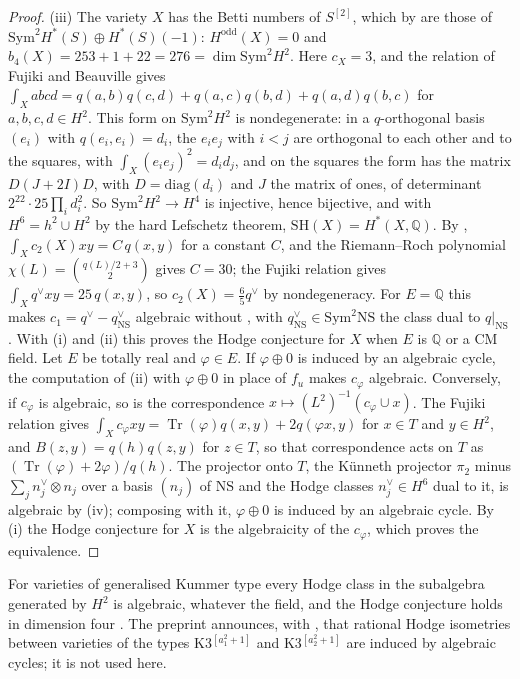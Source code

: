 \documentclass[11pt,reqno]{amsart}
\theoremstyle{plain}
\theoremstyle{definition}
\theoremstyle{remark}
\newcommand{\QQ}{\mathbb{Q}}
\newcommand{\NS}{\mathrm{NS}}
\DeclareMathOperator{\Tr}{Tr}
\begin{document}
\begin{proof}
(iii) The variety $X$ has the Betti numbers of $S^{[2]}$, which by
\cite{dCM02} are those of $\mathrm{Sym}^{2}H^{*}(S)\oplus H^{*}(S)(-1)$:
$H^{\mathrm{odd}}(X)=0$ and $b_{4}(X)=253+1+22=276=\dim\mathrm{Sym}^{2}H^{2}$.
Here $c_{X}=3$, and the relation of Fujiki and Beauville gives
$\int_{X}abcd=q(a,b)q(c,d)+q(a,c)q(b,d)+q(a,d)q(b,c)$ for $a,b,c,d\in H^{2}$.
This form on $\mathrm{Sym}^{2}H^{2}$ is nondegenerate: in a $q$-orthogonal
basis $(e_{i})$ with $q(e_{i},e_{i})=d_{i}$, the $e_{i}e_{j}$ with $i<j$ are
orthogonal to each other and to the squares, with $\int_{X}(e_{i}e_{j})^{2}=
d_{i}d_{j}$, and on the squares the form has the matrix $D(J+2I)D$, with
$D=\mathrm{diag}(d_{i})$ and $J$ the matrix of ones, of determinant
$2^{22}\cdot25\prod_{i}d_{i}^{2}$. So
$\mathrm{Sym}^{2}H^{2}\to H^{4}$ is injective, hence bijective, and with
$H^{6}=h^{2}\cup H^{2}$ by the hard Lefschetz theorem,
$\mathrm{SH}(X)=H^{*}(X,\QQ)$. By \cite{Fuj87},
$\int_{X}c_{2}(X)xy=C\,q(x,y)$ for a constant $C$, and the Riemann--Roch
polynomial $\chi(L)=\binom{q(L)/2+3}{2}$ \cite{EGL01} gives $C=30$; the
Fujiki relation gives $\int_{X}q^{\vee}xy=25\,q(x,y)$, so
$c_{2}(X)=\frac65q^{\vee}$ by nondegeneracy. For $E=\QQ$ this makes
$c_{1}=q^{\vee}-q^{\vee}_{\NS}$ algebraic without \cite{CM13}, with
$q^{\vee}_{\NS}\in\mathrm{Sym}^{2}\NS$ the class dual to $q|_{\NS}$. With (i) and (ii) this proves the Hodge
conjecture for $X$ when $E$ is $\QQ$ or a CM field. Let $E$ be totally real
and $\varphi\in E$. If $\varphi\oplus0$ is induced by an algebraic cycle, the
computation of (ii) with $\varphi\oplus0$ in place of $f_{u}$ makes
$c_{\varphi}$ algebraic. Conversely, if $c_{\varphi}$ is algebraic, so is the
correspondence $x\mapsto(L^{2})^{-1}(c_{\varphi}\cup x)$. The Fujiki relation
gives $\int_{X}c_{\varphi}xy=\Tr(\varphi)q(x,y)+2q(\varphi x,y)$ for $x\in T$
and $y\in H^{2}$, and $B(z,y)=q(h)q(z,y)$ for $z\in T$, so that
correspondence acts on $T$ as $(\Tr(\varphi)+2\varphi)/q(h)$. The projector
onto $T$, the K\"unneth projector $\pi_{2}$ minus
$\sum_{j}n_{j}^{\vee}\otimes n_{j}$ over a basis $(n_{j})$ of $\NS$ and the
Hodge classes $n_{j}^{\vee}\in H^{6}$ dual to it, is algebraic by
(iv); composing with it, $\varphi\oplus0$ is induced by an
algebraic cycle. By (i) the Hodge conjecture for $X$ is the algebraicity of
the $c_{\varphi}$, which proves the equivalence.
\end{proof}

For varieties of generalised Kummer type every Hodge class in the subalgebra
generated by $H^{2}$ is algebraic, whatever the field, and the Hodge
conjecture holds in dimension four \cite{FV25}. The preprint \cite{OG26}
announces, with \cite{Mar24}, that rational Hodge isometries between
varieties of the types K3$^{[a_{1}^{2}+1]}$ and K3$^{[a_{2}^{2}+1]}$ are
induced by algebraic cycles; it is not used here.
\end{document}
